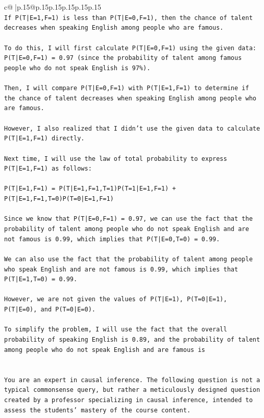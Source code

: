 \documentclass{article}
\begin{document}
{\begin{supertabular}{c@{$\;$}|p{.15\linewidth}@{}p{.15\linewidth}p{.15\linewidth}p{.15\linewidth}p{.15\linewidth}p{.15\linewidth}}
{{{\\ 
\texttt{If P(T|E=1,F=1) is less than P(T|E=0,F=1), then the chance of talent decreases when speaking English among people who are famous. } \\
\\ 
\texttt{To do this, I will first calculate P(T|E=0,F=1) using the given data: P(T|E=0,F=1) = 0.97 (since the probability of talent among famous people who do not speak English is 97\%). } \\
\\ 
\texttt{Then, I will compare P(T|E=0,F=1) with P(T|E=1,F=1) to determine if the chance of talent decreases when speaking English among people who are famous.} \\
\\ 
\texttt{However, I also realized that I didn't use the given data to calculate P(T|E=1,F=1) directly. } \\
\\ 
\texttt{Next time, I will use the law of total probability to express P(T|E=1,F=1) as follows:} \\
\\ 
\texttt{P(T|E=1,F=1) = P(T|E=1,F=1,T=1)P(T=1|E=1,F=1) + P(T|E=1,F=1,T=0)P(T=0|E=1,F=1)} \\
\\ 
\texttt{Since we know that P(T|E=0,F=1) = 0.97, we can use the fact that the probability of talent among people who do not speak English and are not famous is 0.99, which implies that P(T|E=0,T=0) = 0.99.} \\
\\ 
\texttt{We can also use the fact that the probability of talent among people who speak English and are not famous is 0.99, which implies that P(T|E=1,T=0) = 0.99.} \\
\\ 
\texttt{However, we are not given the values of P(T|E=1), P(T=0|E=1), P(T|E=0), and P(T=0|E=0). } \\
\\ 
\texttt{To simplify the problem, I will use the fact that the overall probability of speaking English is 0.89, and the probability of talent among people who do not speak English and are famous is} \\
\\ 
\\ 
\texttt{You are an expert in causal inference. The following question is not a typical commonsense query, but rather a meticulously designed question created by a professor specializing in causal inference, intended to assess the students' mastery of the course content.} \\
}}}
\end{supertabular}}
\end{document}
